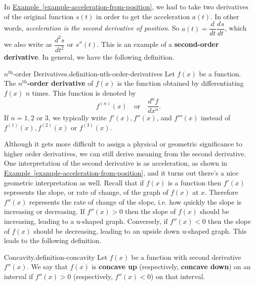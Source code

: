 \documentclass[10pt,]{book}
\newcommand{\terminology}[1]{\textbf{#1}}
\numberwithin{equation}{section}
\newcommand{\dv}[3][]{\dfrac{d^{#1} #2}{d #3^{#1}}}
\begin{document}
\hypertarget{p-118}{}%
In \hyperref[example-acceleration-from-position]{Example~\ref{example-acceleration-from-position}}, we had to take two derivatives of the original function \(s(t)\) in order to get the acceleration \(a(t)\). In other words, \emph{acceleration is the second derivative of position}. So \(a(t) = \dv{}{t}\dv{s}{t}\), which we also write as \(\dv[2]{s}{t}\) or \(s''(t)\). This is an example of a \terminology{second-order derivative}. In general, we have the following definition.%
\begin{definition}{\(n^{\text{th}}\)-order Derivatives.}{definition-nth-order-derivatives}%
\hypertarget{p-119}{}%
Let \(f(x)\) be a function. The \terminology{\(n^{\text{th}}\)-order derivative} of \(f(x)\) is the function obtained by differentiating \(f(x)\) \(n\) times. This function is denoted by%
\begin{equation*}
f^{(n)}(x)\quad\text{or}\quad\dv[n]{f}{x}.
\end{equation*}
If \(n=1, 2\) or \(3\), we typically write \(f'(x), f''(x)\), and \(f'''(x)\) instead of \(f^{(1)}(x), f^{(2)}(x)\) or \(f^{(3)}(x)\).%
\end{definition}
\hypertarget{p-120}{}%
Although it gets more difficult to assign a physical or geometric significance to higher order derivatives, we can still derive meaning from the second derivative. One interpretation of the second derivative is as acceleration, as shown in \hyperref[example-acceleration-from-position]{Example~\ref{example-acceleration-from-position}}, and it turns out there's a nice geometric interpretation as well. Recall that if \(f(x)\) is a function then \(f'(x)\) represents the slope, or rate of change, of the graph of \(f(x)\) at \(x\). Therefore \(f''(x)\) represents the rate of change of the slope, i.e. how quickly the slope is increasing or decreasing. If \(f''(x) >0\) then the slope of \(f(x)\) should be increasing, leading to a u-shaped graph. Conversely, if \(f''(x) <0\) then the slope of \(f(x)\) should be decreasing, leading to an upside down u-shaped graph. This leads to the following definition.%
\begin{definition}{Concavity.}{definition-concavity}%
\hypertarget{p-121}{}%
Let \(f(x)\) be a function with second derivative \(f''(x)\). We say that \(f(x)\) is \terminology{concave up} (respectively, \terminology{concave down}) on an interval if \(f''(x)>0\) (respectively, \(f''(x) <0\)) on that interval.%
\end{definition}
\hypertarget{p-122}{}%
\end{document}
